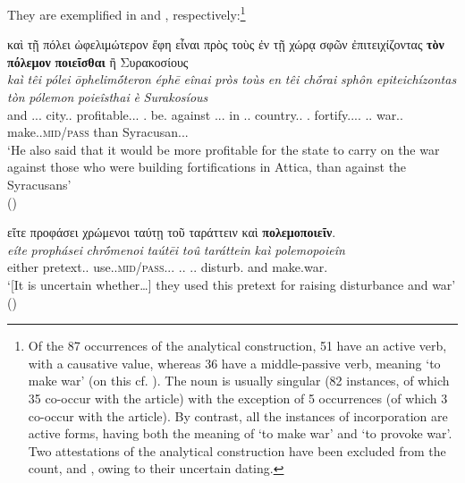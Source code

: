 \documentclass[output=paper,colorlinks,citecolor=brown]{langscibook}
\begin{document}
They are exemplified in  and , respectively:\footnote{Of the 87 occurrences of the analytical construction, 51 have an active verb, with a causative value, whereas 36 have a middle-passive verb, meaning `to make war' (on this cf. \citealt{JiménezLópez2012,Jimenez2016}). The noun is usually singular (82 instances, of which 35 co-occur with the article) with the exception of 5 occurrences (of which 3 co-occur with the article). By contrast, all the instances of incorporation are active forms, having both the meaning of `to make war' and `to provoke war'. Two attestations of the analytical construction have been excluded from the count,  and , owing to their uncertain dating.}

\ea \label{ex:20}
\glll καὶ	τῇ		πόλει		ὠφελιμώτερον		ἔφη          εἶναι       πρὸς τοὺς 		ἐν	τῇ		χώρᾳ		σφῶν            ἐπιτειχίζοντας         \textbf{τὸν} \textbf{πόλεμον} 		\textbf{ποιεῖσθαι}                 ἢ            Συρακοσίους\\
\textit{kaì}	\textit{têi}		\textit{pólei}		\textit{ōphelimṓteron}		\textit{éphē}         \textit{eînai}       \textit{pròs} \textit{toùs} 		\textit{en}	\textit{têi}		\textit{chṓrai}		\textit{sphôn}           \textit{epiteichízontas}        \textit{tòn} \textit{pólemon}		\textit{poieîsthai}                  \textit{è}            \textit{Surakosíous}\\
and	\Art{}.\Dat{}.\F{}.	city.\Dat{}.\F{}	profitable.\Compv{}.\Acc{}.\N{}	\Impf.\Tsg{}   be.\Inf{}       against \Art{}.\Acc{}.\M{}.\Pl{}	in	\Art{}.\Dat{}.\F{}	country.\Dat{}.\F{}	\Tpl{}.\Gen{}               fortify.\Ptcp{}.\Acc{}.\M{}.\Pl{}    \Art{}.\Acc{}.\M{} war.\Acc{}.\M{}		make.\Inf{}.\textsc{mid/pass}           than        Syracusan.\Acc{}.\M{}.\Pl{}\\
\glt `He also said that it would be more profitable for the state to carry on the war against those who       were building fortifications in Attica, than against the Syracusans' \\
\hspace*{\fill}()
\z

\ea \label{ex:21}
\glll εἴτε	προφάσει	χρώμενοι		ταύτῃ		τοῦ		ταράττειν	καὶ \textbf{πολεμοποιεῖν}.\\
\textit{eíte}	\textit{prophásei}	\textit{chrṓmenoi}		\textit{taútēi}		\textit{toû} 		\textit{taráttein}	\textit{kaì} \textit{polemopoieîn}\\
either	pretext.\Dat{}.\F{}	use.\Ptcp{}.\textsc{mid/pass}.\Nom{}.\M{}.\Pl{}	\Dem{}.\Dat{}.\F{}	\Art{}.\Gen.\N{}	disturb.\Inf{}	and make.war.\Inf{}\\
\glt `[It is uncertain whether\ldots{}] they used this pretext for raising disturbance and war' \\
\hspace*{\fill}()
\z
\end{document}
